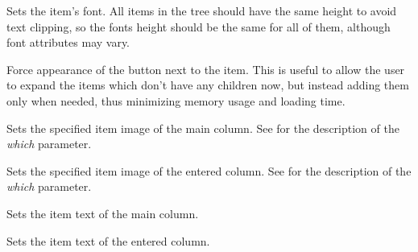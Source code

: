 \label{wxtreelistctrlsetitemfont}


Sets the item's font. All items in the tree should have the same height to avoid
text clipping, so the fonts height should be the same for all of them,
although font attributes may vary.



\label{wxtreelistctrlsetitemhaschildren}


Force appearance of the button next to the item. This is useful to
allow the user to expand the items which don't have any children now,
but instead adding them only when needed, thus minimizing memory
usage and loading time.

\label{wxtreelistctrlsetitemimage}


Sets the specified item image of the main column. See 
for the description of the {\it which} parameter.


Sets the specified item image of the entered column. See 
for the description of the {\it which} parameter.

\label{wxtreelistctrlsetitemtext}


Sets the item text of the main column.


Sets the item text of the entered column.

